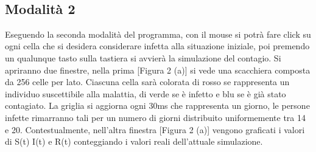 \documentclass[a4paper,10 pt]{article}
\begin{document}
\begin{figure}
\centering
{} \quad {} \\
\caption{}
\label{fig:subfig}
\end{figure}


\subsection{Modalità 2}
Eseguendo la seconda modalità del programma, con il mouse si potrà fare click su ogni cella che si desidera considerare infetta alla situazione iniziale, poi premendo un qualunque tasto sulla tastiera si avvierà la simulazione del contagio. Si apriranno due finestre, nella prima [Figura 2 (a)] si vede una scacchiera composta da 256 celle per lato. Ciascuna cella sarà colorata di rosso se rappresenta un individuo suscettibile alla malattia, di verde se è infetto e blu se è già stato contagiato. La griglia si aggiorna ogni 30ms che rappresenta un giorno, le persone infette rimarranno tali per un numero di giorni distribuito uniformemente tra 14 e 20. Contestualmente, nell'altra finestra [Figura 2 (a)] vengono graficati i valori di S(t) I(t) e R(t) conteggiando i valori reali dell'attuale simulazione.
\end{document}
